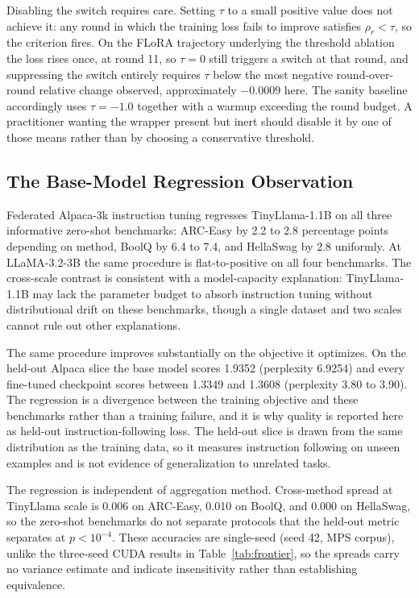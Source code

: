 Disabling the switch requires care. Setting $\tau$ to a small positive value does not achieve it: any round in which the training loss fails to improve satisfies $\rho_r < \tau$, so the criterion fires. On the FLoRA trajectory underlying the threshold ablation the loss rises once, at round 11, so $\tau{=}0$ still triggers a switch at that round, and suppressing the switch entirely requires $\tau$ below the most negative round-over-round relative change observed, approximately $-0.0009$ here. The sanity baseline accordingly uses $\tau{=}-1.0$ together with a warmup exceeding the round budget. A practitioner wanting the wrapper present but inert should disable it by one of those means rather than by choosing a conservative threshold.

\subsection{The Base-Model Regression Observation}
\label{sec:baseregression}
Federated Alpaca-3k \citep{taori2023alpaca} instruction tuning regresses TinyLlama-1.1B \citep{zhang2024tinyllama} on all three informative zero-shot benchmarks: ARC-Easy by 2.2 to 2.8 percentage points depending on method, BoolQ by 6.4 to 7.4, and HellaSwag by 2.8 uniformly. At LLaMA-3.2-3B \citep{dubey2024llama3} the same procedure is flat-to-positive on all four benchmarks. The cross-scale contrast is consistent with a model-capacity explanation: TinyLlama-1.1B may lack the parameter budget to absorb instruction tuning without distributional drift on these benchmarks, though a single dataset and two scales cannot rule out other explanations.

The same procedure improves substantially on the objective it optimizes. On the held-out Alpaca slice the base model scores 1.9352 (perplexity 6.9254) and every fine-tuned checkpoint scores between 1.3349 and 1.3608 (perplexity 3.80 to 3.90). The regression is a divergence between the training objective and these benchmarks rather than a training failure, and it is why quality is reported here as held-out instruction-following loss. The held-out slice is drawn from the same distribution as the training data, so it measures instruction following on unseen examples and is not evidence of generalization to unrelated tasks.

The regression is independent of aggregation method. Cross-method spread at TinyLlama scale is 0.006 on ARC-Easy, 0.010 on BoolQ, and 0.000 on HellaSwag, so the zero-shot benchmarks do not separate protocols that the held-out metric separates at $p < 10^{-4}$. These accuracies are single-seed (seed 42, MPS corpus), unlike the three-seed CUDA results in Table~\ref{tab:frontier}, so the spreads carry no variance estimate and indicate insensitivity rather than establishing equivalence.

